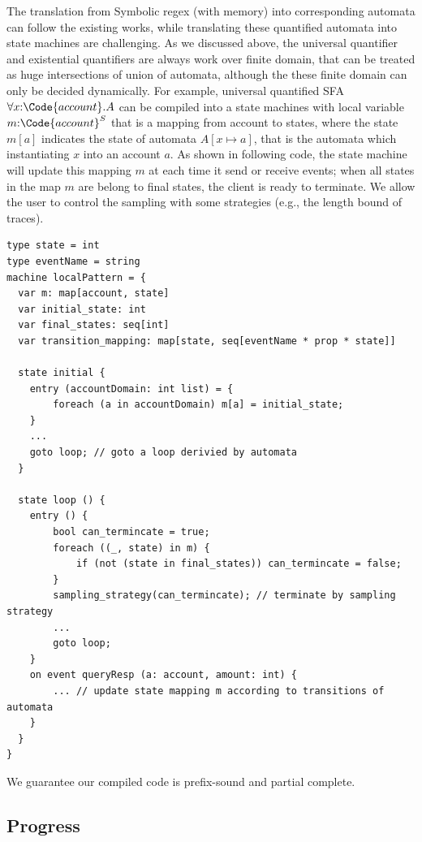The translation from Symbolic regex (with memory) into corresponding automata can follow the existing works, while translating these quantified automata into  state machines are challenging. As we discussed above, the universal quantifier and existential quantifiers are always work over finite domain, that can be treated as huge intersections of union of automata, although the these finite domain can only be decided dynamically. For example, universal quantified SFA $\forall x{:}\Code{account}.A$ can be compiled into a  state machines with local variable $m{:}\Code{account}^S$ that is a mapping from account to states, where the state $m[a]$ indicates the state of automata $A[x\mapsto a]$, that is the automata which instantiating $x$ into an account $a$. As shown in following code, the state machine will update this mapping $m$ at each time it send or receive events; when all states in the map $m$ are belong to final states, the client is ready to terminate. We allow the user to control the sampling with some strategies (e.g., the length bound of traces).

\begin{verbatim}
type state = int
type eventName = string
machine localPattern = {
  var m: map[account, state]
  var initial_state: int
  var final_states: seq[int]
  var transition_mapping: map[state, seq[eventName * prop * state]]
  
  state initial {
    entry (accountDomain: int list) = {
        foreach (a in accountDomain) m[a] = initial_state;
    }
    ...
    goto loop; // goto a loop derivied by automata 
  }

  state loop () {
    entry () {
        bool can_termincate = true;
        foreach ((_, state) in m) {
            if (not (state in final_states)) can_termincate = false;
        }
        sampling_strategy(can_termincate); // terminate by sampling strategy
        ...
        goto loop;
    }
    on event queryResp (a: account, amount: int) {
        ... // update state mapping m according to transitions of automata
    }
  }
}
\end{verbatim}

We guarantee our compiled code is prefix-sound and partial complete.

\subsection{Progress}

